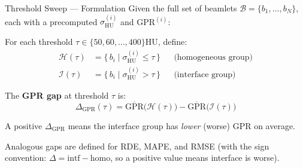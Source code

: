 \documentclass[aspectratio=169, 10pt]{beamer}
\begin{document}
\begin{frame}{Threshold Sweep — Formulation}
  Given the full set of beamlets $\mathcal{B} = \{b_1, \ldots, b_N\}$, each
  with a precomputed $\sigma_{\text{HU}}^{(i)}$ and GPR${}^{(i)}$:

  \vspace{6pt}
  For each threshold $\tau \in \{50, 60, \ldots, 400\}$\;HU, define:
  \begin{align*}
    \mathcal{H}(\tau) &= \bigl\{\, b_i \;\big|\; \sigma_{\text{HU}}^{(i)} \le \tau \,\bigr\}
      &&\text{(homogeneous group)} \\[2pt]
    \mathcal{I}(\tau) &= \bigl\{\, b_i \;\big|\; \sigma_{\text{HU}}^{(i)} > \tau \,\bigr\}
      &&\text{(interface group)}
  \end{align*}

  \vspace{2pt}
  The \textbf{GPR gap} at threshold $\tau$ is:
  \[
    \Delta_{\text{GPR}}(\tau)
    = \overline{\text{GPR}}\bigl(\mathcal{H}(\tau)\bigr)
    - \overline{\text{GPR}}\bigl(\mathcal{I}(\tau)\bigr)
  \]

  A positive $\Delta_{\text{GPR}}$ means the interface group has
  \emph{lower} (worse) GPR on average.

  \vspace{6pt}
  Analogous gaps are defined for RDE, MAPE, and RMSE (with the sign
  convention: $\Delta = \text{intf} - \text{homo}$, so a positive value
  means interface is worse).

\end{frame}
\end{document}
